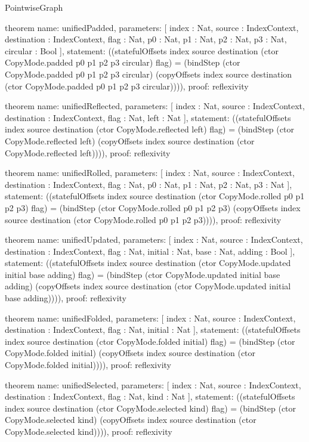 \begin{lexlean}{PointwiseGraph}
\begin{semanticmodule}
theorem{
  name: unifiedPadded,
  parameters: [
    index : Nat,
    source : IndexContext,
    destination : IndexContext,
    flag : Nat,
    p0 : Nat,
    p1 : Nat,
    p2 : Nat,
    p3 : Nat,
    circular : Bool
  ],
  statement: ((statefulOffsets index source destination (ctor CopyMode.padded p0 p1 p2 p3 circular) flag) = (bindStep (ctor CopyMode.padded p0 p1 p2 p3 circular) (copyOffsets index source destination (ctor CopyMode.padded p0 p1 p2 p3 circular)))),
  proof: reflexivity{}
}

theorem{
  name: unifiedReflected,
  parameters: [
    index : Nat,
    source : IndexContext,
    destination : IndexContext,
    flag : Nat,
    left : Nat
  ],
  statement: ((statefulOffsets index source destination (ctor CopyMode.reflected left) flag) = (bindStep (ctor CopyMode.reflected left) (copyOffsets index source destination (ctor CopyMode.reflected left)))),
  proof: reflexivity{}
}

theorem{
  name: unifiedRolled,
  parameters: [
    index : Nat,
    source : IndexContext,
    destination : IndexContext,
    flag : Nat,
    p0 : Nat,
    p1 : Nat,
    p2 : Nat,
    p3 : Nat
  ],
  statement: ((statefulOffsets index source destination (ctor CopyMode.rolled p0 p1 p2 p3) flag) = (bindStep (ctor CopyMode.rolled p0 p1 p2 p3) (copyOffsets index source destination (ctor CopyMode.rolled p0 p1 p2 p3)))),
  proof: reflexivity{}
}

theorem{
  name: unifiedUpdated,
  parameters: [
    index : Nat,
    source : IndexContext,
    destination : IndexContext,
    flag : Nat,
    initial : Nat,
    base : Nat,
    adding : Bool
  ],
  statement: ((statefulOffsets index source destination (ctor CopyMode.updated initial base adding) flag) = (bindStep (ctor CopyMode.updated initial base adding) (copyOffsets index source destination (ctor CopyMode.updated initial base adding)))),
  proof: reflexivity{}
}

theorem{
  name: unifiedFolded,
  parameters: [
    index : Nat,
    source : IndexContext,
    destination : IndexContext,
    flag : Nat,
    initial : Nat
  ],
  statement: ((statefulOffsets index source destination (ctor CopyMode.folded initial) flag) = (bindStep (ctor CopyMode.folded initial) (copyOffsets index source destination (ctor CopyMode.folded initial)))),
  proof: reflexivity{}
}

theorem{
  name: unifiedSelected,
  parameters: [
    index : Nat,
    source : IndexContext,
    destination : IndexContext,
    flag : Nat,
    kind : Nat
  ],
  statement: ((statefulOffsets index source destination (ctor CopyMode.selected kind) flag) = (bindStep (ctor CopyMode.selected kind) (copyOffsets index source destination (ctor CopyMode.selected kind)))),
  proof: reflexivity{}
}


\end{semanticmodule}
\end{lexlean}
